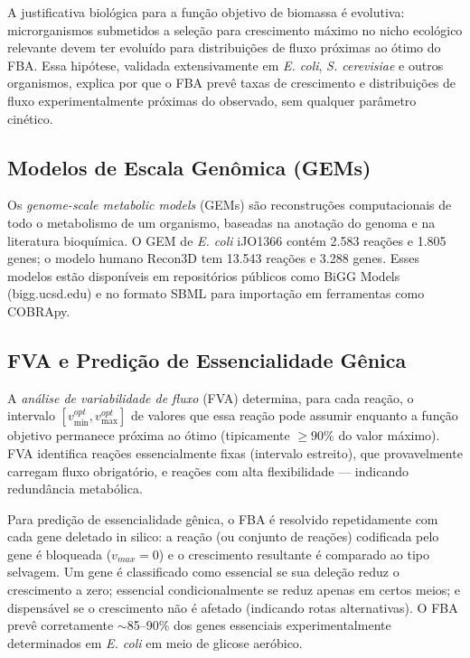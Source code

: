 A justificativa biológica para a função objetivo de biomassa é evolutiva: microrganismos
submetidos a seleção para crescimento máximo no nicho ecológico relevante devem ter
evoluído para distribuições de fluxo próximas ao ótimo do FBA. Essa hipótese, validada
extensivamente em \textit{E. coli}, \textit{S. cerevisiae} e outros organismos, explica
por que o FBA prevê taxas de crescimento e distribuições de fluxo experimentalmente
próximas do observado, sem qualquer parâmetro cinético.

\subsection{Modelos de Escala Genômica (GEMs)}

Os \emph{genome-scale metabolic models} (GEMs) são reconstruções computacionais de todo
o metabolismo de um organismo, baseadas na anotação do genoma e na literatura bioquímica.
O GEM de \textit{E. coli} iJO1366 contém 2.583 reações e 1.805 genes; o modelo humano
Recon3D tem 13.543 reações e 3.288 genes. Esses modelos estão disponíveis em repositórios
públicos como BiGG Models (bigg.ucsd.edu) e no formato SBML para importação em ferramentas
como COBRApy.

\subsection{FVA e Predição de Essencialidade Gênica}

A \emph{análise de variabilidade de fluxo} (FVA) determina, para cada reação, o intervalo
$[v_{\min}^{opt}, v_{\max}^{opt}]$ de valores que essa reação pode assumir enquanto a
função objetivo permanece próxima ao ótimo (tipicamente $\geq 90\%$ do valor máximo). FVA
identifica reações essencialmente fixas (intervalo estreito), que provavelmente carregam
fluxo obrigatório, e reações com alta flexibilidade --- indicando redundância metabólica.

Para predição de essencialidade gênica, o FBA é resolvido repetidamente com cada gene
deletado in silico: a reação (ou conjunto de reações) codificada pelo gene é bloqueada
($v_{max} = 0$) e o crescimento resultante é comparado ao tipo selvagem. Um gene é
classificado como essencial se sua deleção reduz o crescimento a zero; essencial
condicionalmente se reduz apenas em certos meios; e dispensável se o crescimento não
é afetado (indicando rotas alternativas). O FBA prevê corretamente $\sim$85--90\% dos
genes essenciais experimentalmente determinados em \textit{E. coli} em meio de glicose
aeróbico.

